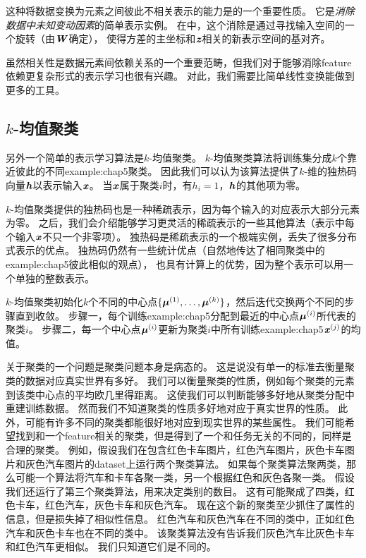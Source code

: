 这种将数据变换为元素之间彼此不相关表示的能力是的一个重要性质。
它是\emph{消除数据中未知变动因素}的简单表示实例。
在中，这个消除是通过寻找输入空间的一个旋转（由$\boldsymbol{\mathit{W}}$确定），
使得方差的主坐标和$\boldsymbol{\mathit{z}}$相关的新表示空间的基对齐。


虽然相关性是数据元素间依赖关系的一个重要范畴，但我们对于能够消除\gls{feature}依赖更复杂形式的表示学习也很有兴趣。
对此，我们需要比简单线性变换能做到更多的工具。

\subsection{$k$-均值聚类}
\label{sec:k_means_clustering}
另外一个简单的表示学习算法是$k$-均值聚类。
$k$-均值聚类算法将训练集分成$k$个靠近彼此的不同\gls{example:chap5}聚类。
因此我们可以认为该算法提供了$k$-维的独热码向量$\boldsymbol{\mathit{h}}$以表示输入$\boldsymbol{\mathit{x}}$。
当$\boldsymbol{\mathit{x}}$属于聚类$i$时，有$h_i=1$，$\boldsymbol{\mathit{h}}$的其他项为零。

$k$-均值聚类提供的独热码也是一种稀疏表示，因为每个输入的对应表示大部分元素为零。
之后，我们会介绍能够学习更灵活的稀疏表示的一些其他算法（表示中每个输入$\boldsymbol{\mathit{x}}$不只一个非零项）。
独热码是稀疏表示的一个极端实例，丢失了很多分布式表示的优点。
独热码仍然有一些统计优点（自然地传达了相同聚类中的\gls{example:chap5}彼此相似的观点），
也具有计算上的优势，因为整个表示可以用一个单独的整数表示。

$k$-均值聚类初始化$k$个不同的中心点$\{\boldsymbol{\mu}^{(1)},\dots,\boldsymbol{\mu}^{(k)}\}$，然后迭代交换两个不同的步骤直到收敛。
步骤一，每个训练\gls{example:chap5}分配到最近的中心点$\boldsymbol{\mu}^{(i)}$所代表的聚类$i$。
步骤二，每一个中心点$\boldsymbol{\mu}^{(i)}$更新为聚类$i$中所有训练\gls{example:chap5}$\boldsymbol{\mathit{x}}^{(j)}$的均值。

关于聚类的一个问题是聚类问题本身是病态的。
这是说没有单一的标准去衡量聚类的数据对应真实世界有多好。
我们可以衡量聚类的性质，例如每个聚类的元素到该类中心点的平均欧几里得距离。
这使我们可以判断能够多好地从聚类分配中重建训练数据。
然而我们不知道聚类的性质多好地对应于真实世界的性质。
此外，可能有许多不同的聚类都能很好地对应到现实世界的某些属性。
我们可能希望找到和一个\gls{feature}相关的聚类，但是得到了一个和任务无关的不同的，同样是合理的聚类。
例如，假设我们在包含红色卡车图片，红色汽车图片，灰色卡车图片和灰色汽车图片的\gls{dataset}上运行两个聚类算法。
如果每个聚类算法聚两类，那么可能一个算法将汽车和卡车各聚一类，另一个根据红色和灰色各聚一类。
假设我们还运行了第三个聚类算法，用来决定类别的数目。
这有可能聚成了四类，红色卡车，红色汽车，灰色卡车和灰色汽车。
现在这个新的聚类至少抓住了属性的信息，但是损失掉了相似性信息。
红色汽车和灰色汽车在不同的类中，正如红色汽车和灰色卡车也在不同的类中。
该聚类算法没有告诉我们灰色汽车比灰色卡车和红色汽车更相似。
我们只知道它们是不同的。

